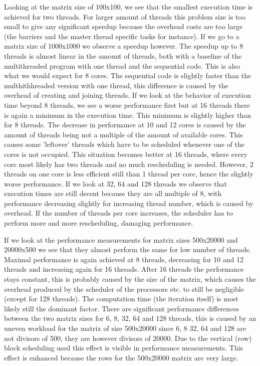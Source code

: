 \documentclass[11pt,a4paper,onecolumn]{article}
\begin{document}
Looking at the matrix size of 100x100, we see that the smallest execution time is achieved for two threads. For larger amount of threads this problem size is too small to give any significant speedup because the overhead costs are too large (the barriers and the master thread specific tasks for instance). If we go to a matrix size of 1000x1000 we observe a speedup however. The speedup up to 8 threads is almost linear in the amount of threads, both with a baseline of the multithreaded program with one thread and the sequential code. This is also what we would expect for 8 cores. The sequential code is slightly faster than the multhithhreaded version with one thread, this difference is caused by the overhead of creating and joining threads. If we look at the behavior of execution time beyond 8 threads, we see a worse performance first but at 16 threads there is again a minimum in the execution time. This minimum is slightly higher than for 8 threads. The decrease in performance at 10 and 12 cores is caused by the amount of threads being not a multiple of the amount of available cores. This causes some 'leftover' threads which have to be scheduled whenever one of the cores is not occupied. This situation becomes better at 16 threads, where every core most likely has two threads and no much rescheduling is needed. However, 2 threads on one core is less efficient still than 1 thread per core, hence the slightly worse performance. If we look at 32, 64 and 128 threads we observe that execution times are still decent because they are all multiple of 8, with performance decreasing slightly for increasing thread number, which is caused by overhead. If the number of threads per core increases, the scheduler has to perform more and more rescheduling, damaging performance.

If we look at the performance measurements for matrix sizes 500x20000 and 20000x500 we see that they almost perform the same for low number of threads. Maximal performance is again achieved at 8 threads, decreasing for 10 and 12 threads and increasing again for 16 threads. After 16 threads the performance stays constant, this is probably caused by the size of the matrix, which causes the overhead produced by the scheduler of the processors etc. to still be negligible (except for 128 threads). The computation time (the iteration itself) is most likely still the dominant factor. There are significant performance differences between the two matrix sizes for 6, 8, 32, 64 and 128 threads, this is caused by an uneven workload for the matrix of size 500x20000 since 6, 8 32, 64 and 128 are not divisors of 500, they are however divisors of 20000. Due to the vertical (row) block scheduling used this effect is visible in performance measurements. This effect is enhanced because the rows for the 500x20000 matrix are very large.
\end{document}
